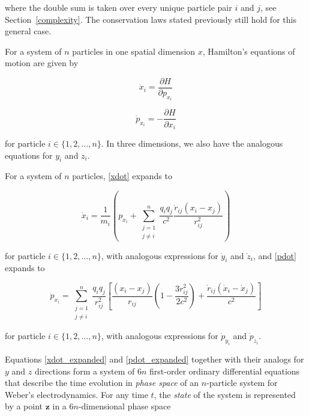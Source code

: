 \documentclass[12pt,a4paper]{article}
\theoremstyle{definition}
\theoremstyle{remark}
\begin{document}
where the double sum is taken over every unique particle pair $i$ and $j$, see Section~\ref{complexity}. The conservation laws stated previously still hold for this general case.

For a system of $n$ particles in one spatial dimension $x$, Hamilton's equations of motion are given by

\begin{equation}\label{xdot}
    \dot{x}_i = \frac{\partial H}{\partial p_{x_i}}
\end{equation}

\begin{equation}\label{pdot}
    \dot{p}_{x_i} = -\frac{\partial H}{\partial x_i}
\end{equation}

for particle $i \in \{1, 2, ..., n\}$. In three dimensions, we also have the analogous equations for $y_i$ and $z_i$.

For a system of $n$ particles, \eqref{xdot} expands to

\begin{equation}\label{xdot_expanded}
    \boxed{\dot{x}_i = \frac{1}{m_i} \left(p_{x_i} + \sum_{\substack{j=1 \\ j \neq i}}^{n} \frac{q_i q_j}{c^2} \frac{\dot{r}_{ij} (x_i - x_j)}{r_{ij}^2}\right)}
\end{equation}

for particle $i \in \{1, 2, ..., n\}$, with analogous expressions for $\dot{y}_i$ and $\dot{z}_i$, and \eqref{pdot} expands to

\begin{equation}\label{pdot_expanded}
    \boxed{\dot{p}_{x_i} = \sum_{\substack{j=1 \\ j \neq i}}^{n} \frac{q_i q_j}{r_{ij}^2}\left[\frac{(x_i - x_j)}{r_{ij}}\left(1 - \frac{3\dot{r}_{ij}^2}{2 c^2}\right) + \frac{\dot{r}_{ij}(\dot{x}_i - \dot{x}_j)}{c^2}\right]}
\end{equation}

for particle $i \in \{1, 2, ..., n\}$, with analogous expressions for $\dot{p}_{y_i}$ and $\dot{p}_{z_i}$.

Equations \eqref{xdot_expanded} and \eqref{pdot_expanded} together with their analogs for $y$ and $z$ directions form a system of $6n$ first-order ordinary differential equations that describe the time evolution in \textit{phase space} of an $n$-particle system for Weber's electrodynamics. For any time $t$, the \textit{state} of the system is represented by a point $\mathbf{z}$ in a $6n$-dimensional phase space
\end{document}
